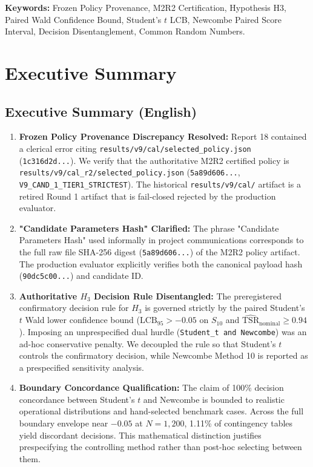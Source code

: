 \documentclass[10pt,a4paper]{article}
\begin{document}
\vspace{6pt}
\noindent \textbf{Keywords:} Frozen Policy Provenance, M2R2 Certification, Hypothesis H3, Paired Wald Confidence Bound, Student's $t$ LCB, Newcombe Paired Score Interval, Decision Disentanglement, Common Random Numbers.

\section{Executive Summary}

\subsection{Executive Summary (English)}
\begin{enumerate}
    \item \textbf{Frozen Policy Provenance Discrepancy Resolved:} Report 18 contained a clerical error citing \texttt{results/v9/cal/selected\_policy.json} (\texttt{1c316d2d...}). We verify that the authoritative M2R2 certified policy is \texttt{results/v9/cal\_r2/selected\_policy.json} (\texttt{5a89d606...}, \texttt{V9\_CAND\_1\_TIER1\_STRICTEST}). The historical \texttt{results/v9/cal/} artifact is a retired Round 1 artifact that is fail-closed rejected by the production evaluator.
    \item \textbf{"Candidate Parameters Hash" Clarified:} The phrase "Candidate Parameters Hash" used informally in project communications corresponds to the full raw file SHA-256 digest (\texttt{5a89d606...}) of the M2R2 policy artifact. The production evaluator explicitly verifies both the canonical payload hash (\texttt{90dc5c00...}) and candidate ID.
    \item \textbf{Authoritative $H_3$ Decision Rule Disentangled:} The preregistered confirmatory decision rule for $H_3$ is governed strictly by the paired Student's $t$ Wald lower confidence bound ($\mathrm{LCB}_{95} > -0.05$ on $S_{10}$ and $\widehat{\mathrm{TSR}}_{\mathrm{nominal}} \ge 0.94$). Imposing an unprespecified dual hurdle (\texttt{Student\_t and Newcombe}) was an ad-hoc conservative penalty. We decoupled the rule so that Student's $t$ controls the confirmatory decision, while Newcombe Method 10 is reported as a prespecified sensitivity analysis.
    \item \textbf{Boundary Concordance Qualification:} The claim of 100\% decision concordance between Student's $t$ and Newcombe is bounded to realistic operational distributions and hand-selected benchmark cases. Across the full boundary envelope near $-0.05$ at $N = 1,200$, 1.11\% of contingency tables yield discordant decisions. This mathematical distinction justifies prespecifying the controlling method rather than post-hoc selecting between them.

\end{enumerate}
\end{document}
